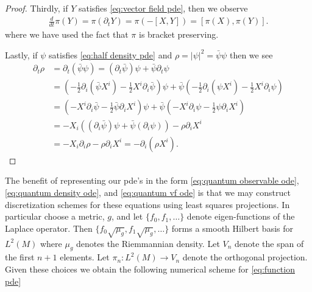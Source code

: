 \documentclass[12pt]{amsart}
\begin{document}
\begin{proof}
	Thirdly, if $Y$ satisfies \eqref{eq:vector field pde}, then we observe 
	\begin{align*}
		\frac{d}{dt} \pi(Y) = \pi ( \partial_{t} Y ) = \pi( - [X,Y] ) = [\pi(X) , \pi(Y) ].
	\end{align*}
	where we have used the fact that $\pi$ is bracket preserving.
	
	Lastly, if $\psi$ satisfies \eqref{eq:half density pde} and $\rho = |\psi|^{2} = \bar{\psi} \psi$ then we see
	\begin{align*}
		\partial_{t} \rho &= \partial_{t} ( \bar{\psi} \psi) = (\partial_{t} \bar{\psi} ) \psi + \bar{\psi} \partial_{t} \psi \\
		&= \left( - \frac{1}{2} \partial_{i} (\bar{\psi} X^{i}) - \frac{1}{2} X^{i} \partial_{i} \bar{\psi} \right) \psi + \bar{\psi} \left( - \frac{1}{2} \partial_{i} (\psi X^{i}) - \frac{1}{2} X^{i} \partial_{i} \psi \right) \\
		&= \left( - X^{i} \partial_{i} \bar{\psi} - \frac{1}{2} \bar{\psi} \partial_{i} X^{i}  \right) \psi + \bar{\psi} \left( - X^{i} \partial_{i} \psi - \frac{1}{2} \psi \partial_{i} X^{i}  \right) \\
		&= - X_{i} \left(  (\partial_{i} \bar{\psi}) \psi + \bar{\psi} (\partial_{i} \psi) \right) - \rho \partial_{i} X^{i} \\
		&= - X_{i} \partial_{i} \rho - \rho \partial_{i} X^{i} = - \partial_{i} ( \rho X^{i}).
	\end{align*}
\end{proof}

The benefit of representing our pde's in the form \eqref{eq:quantum observable ode},\eqref{eq:quantum density ode}, and \eqref{eq:quantum vf ode}
is that we may construct discretization schemes for these equations using least squares projections.
In particular choose a metric, $g$, and let $\{ f_{0}, f_{1},\dots \}$ denote  eigen-functions of the Laplace operator.
Then $\{ f_{0} \sqrt{\mu_{g}} , f_{1} \sqrt{\mu_{g}} , \dots \}$ forms a smooth Hilbert basis for $L^{2}(M)$ where $\mu_{g}$ denotes the Riemmannian density.
Let $V_{n}$ denote the span of the first $n+1$ elements.
Let $\pi_{n}:L^{2}(M) \to V_{n}$ denote the orthogonal projection. 
Given these choices we obtain the following numerical scheme for \eqref{eq:function pde}
\end{document}
